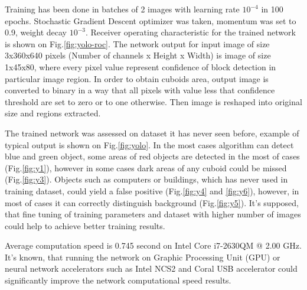 \documentclass{ctuthesis}
\begin{document}
Training has been done in batches of 2 images with learning rate $10^{-4}$ in 100 epochs. Stochastic Gradient Descent optimizer was taken, momentum was set to 0.9, weight decay $10^{-3}$. Receiver operating characteristic for the trained network is shown on Fig.\ref{fig:yolo-roc}. The network output for input image of size 3x360x640 pixels (Number of channels x Height x Width) is image of size 1x45x80, where every pixel value represent confidence of block detection in particular image region. In order to obtain cuboids area, output image is converted to binary in a way that all pixels with value less that confidence threshold are set to zero or to one otherwise. Then image is reshaped into original size and regions extracted.

The trained network was assessed on dataset it has never seen before, example of typical output is shown on Fig.\ref{fig:yolo}. In the most cases algorithm can detect blue and green object, some areas of red objects are detected in the most of cases (Fig.\ref{fig:y1}), however in some cases dark areas of any cuboid could be missed (Fig.\ref{fig:y3}). Objects such as computers or buildings, which has never used in training dataset, could yield a false positive (Fig.\ref{fig:y4} and \ref{fig:y6}), however, in most of cases it can correctly distinguish background (Fig.\ref{fig:y5}). It's supposed, that fine tuning of training parameters and dataset with higher number of images could help to achieve better training results. 

Average computation speed is 0.745 second on Intel Core i7-2630QM @ 2.00 GHz. It's known, that running the network on Graphic Processing Unit (GPU) or neural network accelerators such as Intel NCS2 and Coral USB accelerator could significantly improve the network computational speed results.
\end{document}

